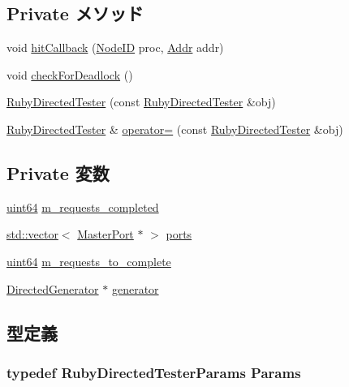 \subsection*{Private メソッド}
\begin{DoxyCompactItemize}
\item 
void \hyperlink{classRubyDirectedTester_a875ac440c302467e1c727800d0dc2c3c}{hitCallback} (\hyperlink{TypeDefines_8hh_a83c14b4ae37e80071f6b3506a6c46151}{NodeID} proc, \hyperlink{base_2types_8hh_af1bb03d6a4ee096394a6749f0a169232}{Addr} addr)
\item 
void \hyperlink{classRubyDirectedTester_a514b854b1aebca4ab64690855d9588b9}{checkForDeadlock} ()
\item 
\hyperlink{classRubyDirectedTester_a77546a6ae770d1afd25e330d3643721f}{RubyDirectedTester} (const \hyperlink{classRubyDirectedTester_1_1RubyDirectedTester}{RubyDirectedTester} \&obj)
\item 
\hyperlink{classRubyDirectedTester_1_1RubyDirectedTester}{RubyDirectedTester} \& \hyperlink{classRubyDirectedTester_aeeec8bf132659d6d6fd269419c117f89}{operator=} (const \hyperlink{classRubyDirectedTester_1_1RubyDirectedTester}{RubyDirectedTester} \&obj)
\end{DoxyCompactItemize}
\subsection*{Private 変数}
\begin{DoxyCompactItemize}
\item 
\hyperlink{TypeDefines_8hh_a29940ae63ec06c9998bba873e25407ad}{uint64} \hyperlink{classRubyDirectedTester_a76225f51f5fe6a376fa794f2e7b0a1c3}{m\_\-requests\_\-completed}
\item 
\hyperlink{classstd_1_1vector}{std::vector}$<$ \hyperlink{classMasterPort}{MasterPort} $\ast$ $>$ \hyperlink{classRubyDirectedTester_a9b3aedb8e244949f057468d6ba55c41a}{ports}
\item 
\hyperlink{TypeDefines_8hh_a29940ae63ec06c9998bba873e25407ad}{uint64} \hyperlink{classRubyDirectedTester_aaebdb8b9bebab829bd0d1863bd3cfd1d}{m\_\-requests\_\-to\_\-complete}
\item 
\hyperlink{classRubyDirectedTester_1_1DirectedGenerator}{DirectedGenerator} $\ast$ \hyperlink{classRubyDirectedTester_a85bfc687ecf39da27bff2f25c39043c9}{generator}
\end{DoxyCompactItemize}


\subsection{型定義}
\hypertarget{classRubyDirectedTester_af24daccceb54fc519ecd978200efef2d}{
\subsubsection[{Params}]{\setlength{\rightskip}{0pt plus 5cm}typedef RubyDirectedTesterParams {\bf Params}}}
\label{classRubyDirectedTester_af24daccceb54fc519ecd978200efef2d}


